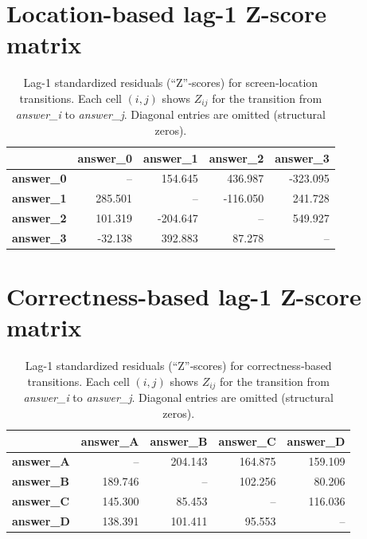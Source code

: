\documentclass{article}
\begin{document}
\begin{appendices}
    \section{Location-based lag-1 Z-score matrix}
    \label{app:lsa_location}
    \begin{table}[H]
        \centering
        \begin{tabular}{lrrrr}
        \hline
                    & \textbf{answer\_0}  & \textbf{answer\_1}   & \textbf{answer\_2}   & \textbf{answer\_3}   \\ 
        \hline
        \textbf{answer\_0}  &   --        &   154.645   &   436.987   &  -323.095   \\
        \textbf{answer\_1}  &  285.501    &    --       &  -116.050   &   241.728   \\
        \textbf{answer\_2}  &  101.319    &  -204.647   &    --       &   549.927   \\
        \textbf{answer\_3}  &  -32.138    &   392.883   &    87.278   &    --       \\
        \hline
        \end{tabular}
        \caption{Lag-1 standardized residuals (“Z”‐scores) for screen‐location transitions. Each cell $(i,j)$ shows $Z_{ij}$ for the transition from \textit{answer\_i} to \textit{answer\_j}. Diagonal entries are omitted (structural zeros).}
        \label{tab:lsa_location}
    \end{table}


    \section{Correctness-based lag-1 Z-score matrix}
    \label{app:lsa_label}
    \begin{table}[H]
        \centering
        \begin{tabular}{lrrrr}
        \hline
                    & \textbf{answer\_A}   & \textbf{answer\_B}   & \textbf{answer\_C}   & \textbf{answer\_D}   \\ 
        \hline
        \textbf{answer\_A}  &   --       &   204.143   &   164.875   &   159.109   \\
        \textbf{answer\_B}  &  189.746   &    --       &   102.256   &    80.206   \\
        \textbf{answer\_C}  &  145.300   &    85.453   &    --       &   116.036   \\
        \textbf{answer\_D}  &  138.391   &   101.411   &    95.553   &    --       \\
        \hline
        \end{tabular}
        \caption{Lag-1 standardized residuals (“Z”‐scores) for correctness‐based transitions. Each cell $(i,j)$ shows $Z_{ij}$ for the transition from \textit{answer\_i} to \textit{answer\_j}. Diagonal entries are omitted (structural zeros).}
        \label{tab:lsa_label}
    \end{table}
    
\end{appendices}
\end{document}
